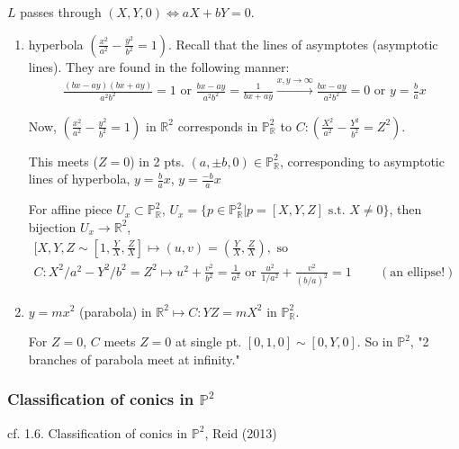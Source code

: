 $L$ passes through $(X,Y,0) \Longleftrightarrow a X + bY = 0$. 



\begin{enumerate}
	\item[(a)]  hyperbola $\left( \frac{x^2}{a^2} - \frac{y^2}{b^2} = 1 \right)$. Recall that the lines of asymptotes (asymptotic lines). They are found in the following manner: 
	\[
	\begin{gathered}
	\frac{(bx-ay)(bx + ay)}{a^2 b^2} = 1 \text{ or } \frac{bx-ay}{a^2 b^2} =  \frac{1}{ bx + ay} \xrightarrow{ x,y \to \infty} \frac{bx- ay}{a^2 b^2 } =0 \text{ or } y = \frac{b}{a} x
	\end{gathered}\]
	
	Now, $\left( \frac{x^2}{a^2} - \frac{y^2}{b^2} = 1 \right)$ in $\mathbb{R}^2$ 
	corresponds in $\mathbb{P}^2_{\mathbb{R}}$ to $C: \left( \frac{X^2}{a^2} - \frac{Y^2}{b^2} = Z^2 \right)$.
	
	This meets ($Z=0$) in 2 pts. $(a, \pm b, 0) \in \mathbb{P}^2_{\mathbb{R}}$, corresponding to asymptotic lines of hyperbola, $y = \frac{b}{a}x$, $y = \frac{-b}{a} x$
	
	For affine piece $U_x \subset \mathbb{P}^2_{\mathbb{R}}$, $U_x = \lbrace p \in \mathbb{P}^2_{\mathbb{R}} | p = [X,Y,Z] \text{ s.t. } X \neq 0 \rbrace$, then \\
	bijection $U_x \to \mathbb{R}^2$, 
	\[
	\begin{gathered}
	[X,Y,Z \sim [1, \frac{Y}{X}, \frac{Z}{X} ] \mapsto (u,v) = \left( \frac{Y}{X}, \frac{Z}{X} \right), \text{ so } \\
	C : X^2/a^2  - Y^2/b^2 = Z^2 \mapsto u^2 + \frac{v^2}{b^2} = \frac{1}{a^2} \text{ or } \frac{u^2}{1/a^2} + \frac{v^2}{ (b/a)^2 } = 1 \qquad \, (\text{an ellipse!})
	\end{gathered}
	\]
	\item[(b)] $y = mx^2$ (parabola) in $\mathbb{R}^2 \mapsto  C: YZ = mX^2$ in $\mathbb{P}^2_{\mathbb{R}}$.
	
	For $Z = 0$, $C$ meets $Z=0$ at single pt. $[0, 1, 0] \sim [0, Y, 0]$. So in $\mathbb{P}^2$, "2 branches of parabola meet at infinity."
\end{enumerate} 

\subsubsection{Classification of conics in $\mathbb{P}^2$}

cf. 1.6. Classification of conics in $\mathbb{P}^2$, Reid (2013) \cite{agat:Reid2013}


